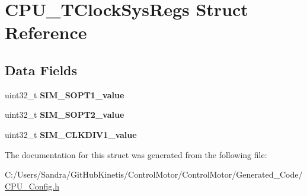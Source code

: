 \hypertarget{struct_c_p_u___t_clock_sys_regs}{}\section{C\+P\+U\+\_\+\+T\+Clock\+Sys\+Regs Struct Reference}
\label{struct_c_p_u___t_clock_sys_regs}
\subsection*{Data Fields}
\begin{DoxyCompactItemize}
\item 
uint32\+\_\+t {\bfseries S\+I\+M\+\_\+\+S\+O\+P\+T1\+\_\+value}\hypertarget{struct_c_p_u___t_clock_sys_regs_a3139ffa5bd4f0ae72a911017f86fefbe}{}\label{struct_c_p_u___t_clock_sys_regs_a3139ffa5bd4f0ae72a911017f86fefbe}

\item 
uint32\+\_\+t {\bfseries S\+I\+M\+\_\+\+S\+O\+P\+T2\+\_\+value}\hypertarget{struct_c_p_u___t_clock_sys_regs_a201dd25031f100365de3caf816f249f6}{}\label{struct_c_p_u___t_clock_sys_regs_a201dd25031f100365de3caf816f249f6}

\item 
uint32\+\_\+t {\bfseries S\+I\+M\+\_\+\+C\+L\+K\+D\+I\+V1\+\_\+value}\hypertarget{struct_c_p_u___t_clock_sys_regs_a086e9649e44b9f5cdb97aa2c19d4d609}{}\label{struct_c_p_u___t_clock_sys_regs_a086e9649e44b9f5cdb97aa2c19d4d609}

\end{DoxyCompactItemize}


The documentation for this struct was generated from the following file\+:\begin{DoxyCompactItemize}
\item 
C\+:/\+Users/\+Sandra/\+Git\+Hub\+Kinetis/\+Control\+Motor/\+Control\+Motor/\+Generated\+\_\+\+Code/\hyperlink{_c_p_u___config_8h}{C\+P\+U\+\_\+\+Config.\+h}\end{DoxyCompactItemize}
